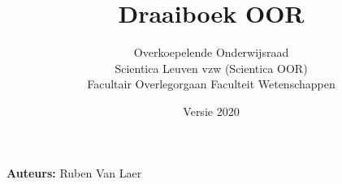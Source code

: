 \documentclass[a4paper,11pt]{article}
\title{Draaiboek OOR}
\author{Overkoepelende Onderwijsraad \\ Scientica Leuven vzw (Scientica OOR) \\ Facultair Overlegorgaan Faculteit Wetenschappen}
\date{Versie 2020}
\begin{document}
	\maketitle
	\textbf{Auteurs:} Ruben Van Laer
\end{document}
